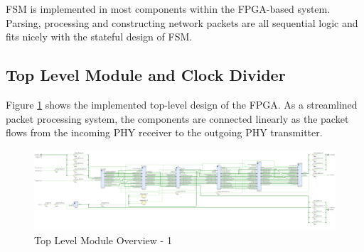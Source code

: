\documentclass[a4paper]{report}
\begin{document}
FSM is implemented in most components within the FPGA-based system. Parsing, processing and constructing network packets are all sequential logic and fits nicely with the stateful design of FSM.

\subsection{Top Level Module and Clock Divider}
\label{section:implementation-hardware-implementation-top-level-clock-divdier}

Figure \ref{fig:top-level-design} shows the implemented top-level design of the FPGA. As a streamlined packet processing system, the components are connected linearly as the packet flows from the incoming PHY receiver to the outgoing PHY transmitter.

\begin{landscape}
\begin{figure}[h!]
  \centering
  \includegraphics*[viewport={0 0 950 600}, height=\textwidth, width=2\textheight, keepaspectratio]{imgs/top-level-module.png}
  \caption{Top Level Module Overview - 1}
  \label{fig:top-level-design}
\end{figure}
\begin{figure}[h!]
  \ContinuedFloat
  \centering

\end{figure}
\end{landscape}
\end{document}
